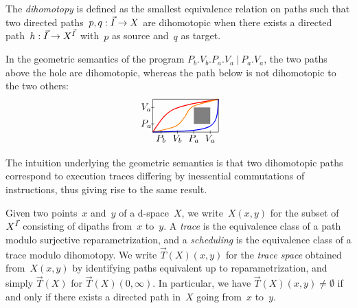 \documentclass[orivec]{llncs} \usepackage[T1]{fontenc}
\renewcommand{\P}[1]{P_{#1}}
\newcommand{\V}[1]{V_{#1}}
\newcommand{\tspace}[1]{\vec T(#1)}
\begin{document}
\begin{definition}
  \label{def:dihomotopy}
  The \emph{dihomotopy} is defined as the smallest equivalence relation on paths
  such that two directed paths~$p,q:\vec{I}\to X$ are dihomotopic when there exists
  a directed path~$h:\vec{I}\to X^{\vec{I}}$ with~$p$ as source and~$q$ as target.
\end{definition}

\begin{example}
  In the geometric semantics of the program $\P b.\V b.\P a.\V a\ |\ \P a.\V a$,
the two paths above the hole are dihomotopic, whereas the path below is not
  dihomotopic to the two others:
   \[
   \begin{tikzpicture}[scale=0.6]
     \draw[line width=0.3mm,color=red] (0,0) .. controls (1,1.5) .. (4,2);
     \draw[line width=0.3mm,color=orange] (0,0) .. controls (1.5,.3) .. (2,1) .. controls (2.3,1.6) .. (4,2);
     \draw[line width=0.3mm,color=blue] (0,0) .. controls (3.9,0.1) .. (4,2);
     \draw (0,0) -- (0,2) -- (4,2) -- (4,0) -- cycle;
     \fill[fill=gray] (2.5,.5) -- (2.5,1.5) -- (3.5,1.5) -- (3.5,.5) -- cycle;
     \foreach \x in {0,1} \draw (-1mm,\x+.5) -- (1mm,\x+.5);
     \foreach \x in {0,1,2,3} \draw (\x+.5,-1mm) -- (\x+.5,1mm);
     \draw (.5,-4mm) node {$\P b$};
     \draw (1.5,-4mm) node {$\V b$};
     \draw (2.5,-4mm) node {$\P a$};
     \draw (3.5,-4mm) node {$\V a$};
     \draw (-4mm,.5) node {$\P a$};
     \draw (-4mm,1.5) node {$\V a$};
   \end{tikzpicture}
   \vspace{-2ex}
   \]
\end{example}

\noindent
The intuition underlying the geometric semantics is that two dihomotopic paths
correspond to execution traces differing by inessential commutations of
instructions, thus giving rise to the same result.

Given two points~$x$ and~$y$ of a d-space~$X$, we write~$X(x,y)$ for the subset
of~$X^{\vec{I}}$ consisting of dipaths from~$x$ to~$y$. A \emph{trace} is the
equivalence class of a path modulo surjective reparametrization, and a
\emph{scheduling} is the equivalence class of a trace modulo dihomotopy. We write
$\tspace{X}(x,y)$ for the \emph{trace space} obtained from~$X(x,y)$ by
identifying paths equivalent up to reparametrization, and simply $\tspace{X}$
for $\tspace{X}(0,\infty)$. In particular, we have
$\tspace{X}(x,y)\neq\emptyset$ if and only if there exists a directed path
in~$X$ going from~$x$ to~$y$.
\end{document}

